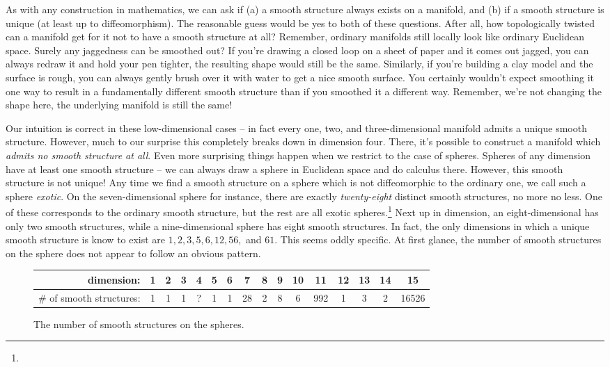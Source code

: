 As with any construction in mathematics, we can ask if (a) a smooth structure always exists on a manifold, and (b) if a smooth structure is unique (at least up to diffeomorphism). The reasonable guess would be yes to both of these questions. After all, how topologically twisted can a manifold get for it not to have a smooth structure at all? Remember, ordinary manifolds still locally look like ordinary Euclidean space. Surely any jaggedness can be smoothed out? If you're drawing a closed loop on a sheet of paper and it comes out jagged, you can always redraw it and hold your pen tighter, the resulting shape would still be the same. Similarly, if you're building a clay model and the surface is rough, you can always gently brush over it with water to get a nice smooth surface. You certainly wouldn't expect smoothing it one way to result in a fundamentally different smooth structure than if you smoothed it a different way. Remember, we're not changing the shape here, the underlying manifold is still the same!

Our intuition is correct in these low-dimensional cases -- in fact every one, two, and three-dimensional manifold admits a unique smooth structure. However, much to our surprise this completely breaks down in dimension four. There, it's possible to construct a manifold which \emph{admits no smooth structure at all}. Even more surprising things happen when we restrict to the case of spheres. Spheres of any dimension have at least one smooth structure -- we can always draw a sphere in Euclidean space and do calculus there. However, this smooth structure is not unique! 
Any time we find a smooth structure on a sphere which is not diffeomorphic to the ordinary one, we call such a sphere \emph{exotic}.
On the seven-dimensional sphere for instance, there are exactly \emph{twenty-eight} distinct smooth structures, no more no less.
One of these corresponds to the ordinary smooth structure, but the rest are all exotic spheres.\footnote{}
Next up in dimension, an eight-dimensional has only two smooth structures, while a nine-dimensional sphere has eight smooth structures. In fact, the only dimensions in which a unique smooth structure is know to exist are $1,2,3,5,6,12,56,$ and $61$. This seems oddly specific.
At first glance, the number of smooth structures on the sphere does not appear to follow an obvious pattern.
\begin{figure}[ht]
	\renewcommand{\arraystretch}{1.2}
	\centering
	\begin{tabular}{r|c|c|c|c|c|c|c|c|c|c|c|c|c|c|c}
		\textrm{dimension:} & 1 & 2 & 3 & 4 & 5 & 6 & 7 & 8 & 9 & 10 & 11 & 12 & 13 & 14 & 15\\
		\hline
		\textrm{\# of smooth structures:} & 1 & 1 & 1 & ? & 1 & 1 & 28 & 2 & 8 & 6 & 992 & 1 & 3 & 2 & 16526\\
	\end{tabular}
	\medskip
	\caption{The number of smooth structures on the spheres.}
\end{figure}

